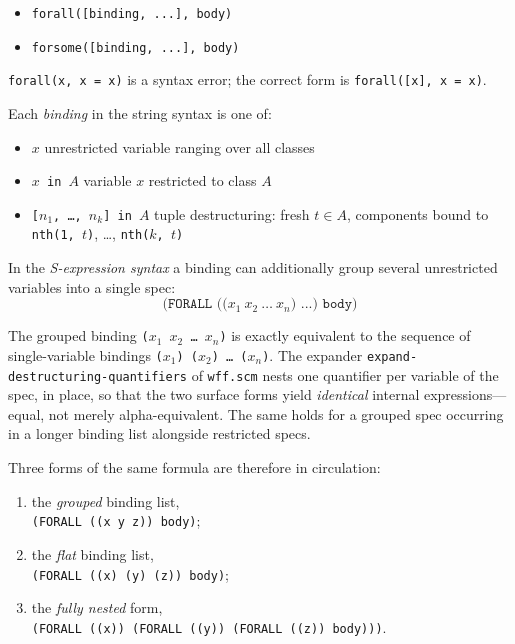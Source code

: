 \begin{itemize}
\item \texttt{forall([binding, ...], body)}

\item \texttt{forsome([binding, ...], body)}
\end{itemize}

\noindent
\texttt{forall(x, x = x)} is a syntax error; the correct form is
\texttt{forall([x], x = x)}.

\noindent
Each \emph{binding} in the string syntax is one of:

\begin{itemize}
\item \texttt{$x$} unrestricted variable ranging over all classes
\item \texttt{$x$ in $A$} variable $x$ restricted to class $A$
\item \texttt{[$n_1$, \ldots, $n_k$] in $A$} tuple destructuring: fresh $t \in A$, components bound to \texttt{nth(1,~$t$)}, \ldots, \texttt{nth($k$,~$t$)}
\end{itemize}

\noindent
In the \emph{S-expression syntax} a binding can additionally group
several unrestricted variables into a single spec:
\[
  \texttt{(FORALL ((}x_1\ x_2\ \ldots\ x_n\texttt{) ...) body)}
\]
\begin{sloppypar}
The grouped binding \texttt{($x_1$ $x_2$ \ldots\ $x_n$)} is exactly
equivalent to the sequence of single-variable bindings
\texttt{($x_1$) ($x_2$) \ldots\ ($x_n$)}.  The expander
\texttt{expand-\allowbreak destructuring-\allowbreak quantifiers}
of \texttt{wff.scm} nests one
quantifier per variable of the spec, in place, so that the two surface
forms yield \emph{identical} internal expressions---equal, not merely
alpha-equivalent.  The same holds for a grouped spec occurring in a
longer binding list alongside restricted specs.
\end{sloppypar}

Three forms of the same formula are therefore in circulation:

\begin{enumerate}[label=(\arabic*),leftmargin=1.2cm]
\item the \emph{grouped} binding list,\\
      \texttt{(FORALL ((x y z)) body)};
\item the \emph{flat} binding list,\\
      \texttt{(FORALL ((x) (y) (z)) body)};
\item the \emph{fully nested} form,\\
      \texttt{(FORALL ((x)) (FORALL ((y)) (FORALL ((z)) body)))}.
\end{enumerate}

